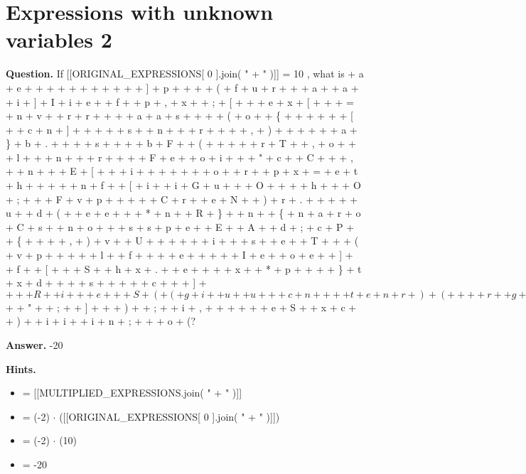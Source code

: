 \documentclass{article}
\begin{document}
\section*{Expressions with unknown variables 2}
\textbf{Question.} If [[ORIGINAL\_EXPRESSIONS[ 0 ].join( " + " )]] = 10 ,
                    what is   + a + e +   +   +   +   +   +   +   + 
 +   +   + ] + p +   +   +   + ( + f + u + r +   +   + a +   + a +   + i + ] + I + i + e +   + f +   + p + , + x +   + ; + [ +   + 
 + e + x + [ +   +   + = + n + v +   + r + r +   +   +   + a + a + s +   +   +   + ( + o +   + \{ +   +   +   +   +   + [ +   + c + n + ] +   +   +   +   + s +   + n + 
 +   + r +   +   +   + , + ) +   +   +   +   +   + a + \} + b + . +   +   +   + s +   +   +   + b + F +   + ( +   +   +   +   + r + T +   + , + o +   +   + l +   +   + n +   +   + r +   +   +   + F + e +   + o + i +   +   + " + c +   + C +   +   + , +   + n +   +   + E + [ +   +   + i +   + 
 +   +   +   +   + o +   + r +   + p + x + = + e + t + h +   +   +   +   + n + f +   + [ + i +   + i + G + u +   +   + O +   +   +   + h +   +   + O + ; +   +   + F + v + p +   +   +   +   + C + r +   + e + N +   + ) + r + . +   +   +   +   + u +   + d + ( +   + e + e +   +   + * + n +   + R + \} +   + n +   + \{ + n + a + r + o + C + s +   + n + o +   + 
 + s + s + p + e +   + E +   + A +   + d + ; + c + P +   + \{ +   +   +   + , + ) + v +   + U +   +   +   +   +   + i +   + 
 + s +   + e +   + T +   +   + ( + v + p +   +   +   +   + l +   + f +   +   +   + e +   +   +   +   + I + e +   + o + e +   + ] +   + f +   + [ +   +   + S +   + h + x + . +   + e +   +   +   + x +   + * + p +   +   +   + \} + t + x + d +   +   +   + s +   +   +   +   + c +   +   + ] + $ + 
 +   + R +   + i +   +   + e +   +   + S + ( + ( + g + i +   + u +   + u + 
 +   + c + n +   +   + 
 + t + e + n + r + ) + ( +   +   +   + r +   + g + f +   +   + u + o + s +   +   +   +   +   +   + ) + ) + ] + ( + u +   +   +   +   + o + O +   +   +   +   +   + a + ) + c +   + [ +   +   +   +   + f + t + ) + $ +   + " +   + ; +   + ] +   +   + ) +   + ; +   + i + , +   +   +   +   +   + e + S +   + x + c +   + ) +   + i + i +   + i + n + ; +   +   + o + (?

\textbf{Answer.} -20

\textbf{Hints.}
\begin{itemize}
  \item = [[MULTIPLIED\_EXPRESSIONS.join( " + " )]]
  \item = (-2) $\cdot$ ([[ORIGINAL\_EXPRESSIONS[ 0 ].join( " + " )]])
  \item = (-2) $\cdot$ (10)
  \item = -20
\end{itemize}
\end{document}
